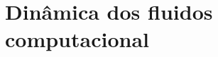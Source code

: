 \documentclass[tese_patricia]{subfiles}%
\begin{document}

\chapter[Dinâmica dos fluidos computacional]{Dinâmica dos fluidos computacional}
\label{capitulo:Cap2}
\end{document}
